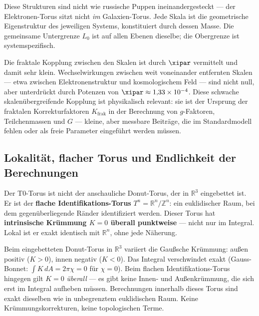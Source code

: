 \begin{keypoint}
Diese Strukturen sind nicht wie russische Puppen ineinandergesteckt — der Elektronen-Torus sitzt nicht \textit{im} Galaxien-Torus. Jede Skala ist die geometrische Eigenstruktur des jeweiligen Systems, konstituiert durch dessen Masse. Die gemeinsame Untergrenze $L_0$ ist auf allen Ebenen dieselbe; die Obergrenze ist systemspezifisch.

Die fraktale Kopplung zwischen den Skalen ist durch $\xipar$ vermittelt und damit sehr klein. Wechselwirkungen zwischen weit voneinander entfernten Skalen — etwa zwischen Elektronenstruktur und kosmologischem Feld — sind nicht null, aber unterdrückt durch Potenzen von $\xipar \approx 1{,}33 \times 10^{-4}$. Diese schwache skalenübergreifende Kopplung ist physikalisch relevant: sie ist der Ursprung der fraktalen Korrekturfaktoren $K_{\text{frak}}$ in der Berechnung von $g$-Faktoren, Teilchenmassen und $G$ — kleine, aber messbare Beiträge, die im Standardmodell fehlen oder als freie Parameter eingeführt werden müssen.
\end{keypoint}

\subsection{Lokalität, flacher Torus und Endlichkeit der Berechnungen}

Der T0-Torus ist nicht der anschauliche Donut-Torus, der in $\mathbb{R}^3$ eingebettet ist. Er ist der \textbf{flache Identifikations-Torus} $T^n = \mathbb{R}^n / \mathbb{Z}^n$: ein euklidischer Raum, bei dem gegenüberliegende Ränder identifiziert werden. Dieser Torus hat \textbf{intrinsische Krümmung $K = 0$ überall punktweise} — nicht nur im Integral. Lokal ist er exakt identisch mit $\mathbb{R}^n$, ohne jede Näherung.

\begin{keypoint}
Beim eingebetteten Donut-Torus in $\mathbb{R}^3$ variiert die Gaußsche Krümmung: außen positiv ($K > 0$), innen negativ ($K < 0$). Das Integral verschwindet exakt (Gauss-Bonnet: $\int K\,dA = 2\pi\chi = 0$ für $\chi = 0$). Beim flachen Identifikations-Torus hingegen gilt $K = 0$ \emph{überall} — es gibt keine Innen- und Außenkrümmung, die sich erst im Integral aufheben müssen. Berechnungen innerhalb dieses Torus sind exakt dieselben wie in unbegrenztem euklidischen Raum. Keine Krümmungskorrekturen, keine topologischen Terme.
\end{keypoint}

